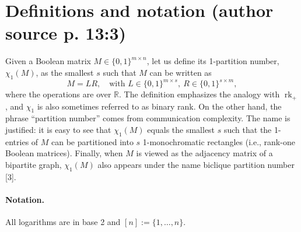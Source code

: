 \documentclass[10pt,a4paper]{article}
\newcommand{\rk}{\operatorname{rk}}
\newcommand{\RR}{\mathbb R}
\begin{document}
\section*{Definitions and notation (author source p. 13:3)}
Given a Boolean matrix $M\in\{0,1\}^{m\times n}$, let us define its 1-partition number, $\chi_1(M)$, as the smallest $s$ such that $M$ can be written as
\[M=LR,\quad\text{with }L\in\{0,1\}^{m\times s},\ R\in\{0,1\}^{s\times m},\]
where the operations are over $\RR$. The definition emphasizes the analogy with $\rk_+$, and $\chi_1$ is also sometimes referred to as binary rank. On the other hand, the phrase ``partition number'' comes from communication complexity. The name is justified: it is easy to see that $\chi_1(M)$ equals the smallest $s$ such that the 1-entries of $M$ can be partitioned into $s$ 1-monochromatic rectangles (i.e., rank-one Boolean matrices). Finally, when $M$ is viewed as the adjacency matrix of a bipartite graph, $\chi_1(M)$ also appears under the name biclique partition number [3].
\paragraph{Notation.} All logarithms are in base 2 and $[n]:=\{1,\ldots,n\}$.
\end{document}
